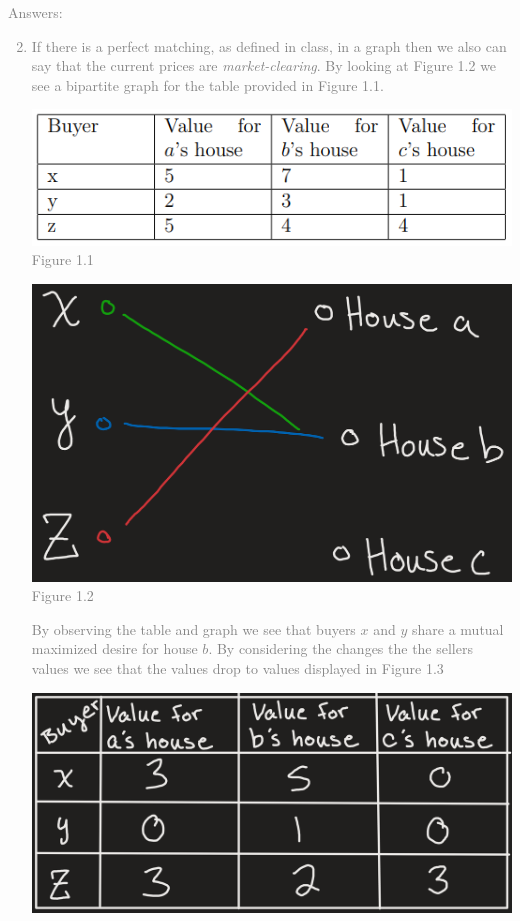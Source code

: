 \documentclass[11pt]{article}
\begin{document}
\textcolor{gray}{
Answers:
\begin{enumerate}
	\setcounter{enumi}{1}
	\item If there is a perfect matching, as defined in class, in a graph then we also can say that the current prices are \textit{market-clearing}.  By looking at Figure 1.2 we see a bipartite graph for the table provided in Figure 1.1.  
	\begin{center}
		\includegraphics[scale=1.5]{Figure1.1}\\
		Figure 1.1
	\end{center}
	\begin{center}
		\includegraphics[scale=0.3]{Figure1.2}\\
		Figure 1.2
	\end{center}
  By observing the table and graph we see that buyers $x$ and $y$ share a mutual maximized desire for house $b$.  By considering the changes the the sellers values we see that the values drop to values displayed in Figure 1.3
	\begin{center}
		\includegraphics[scale=0.3]{Figure1.3}\\

\end{center}
\end{enumerate}}
\end{document}
